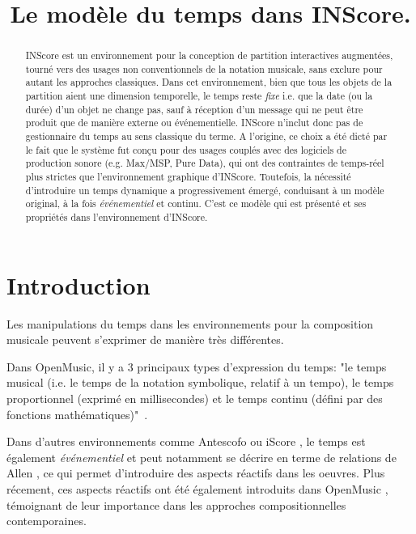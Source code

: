 \documentclass{article}
\title{Le modèle du temps dans INScore.}
\begin{document}
%
\maketitle
%
\begin{abstract}
INScore est un environnement pour la conception de partition interactives augmentées, tourné vers des usages non conventionnels de la notation musicale, sans exclure pour autant les approches classiques. Dans cet environnement, bien que tous les objets de la partition aient une dimension temporelle, le temps reste \emph{fixe} i.e. que la date (ou la durée) d'un objet ne change pas, sauf à réception d'un message qui ne peut être produit que de manière externe ou événementielle. INScore n'inclut donc pas de gestionnaire du temps au sens classique du terme. 
A l'origine, ce choix a été dicté par le fait que le système fut conçu pour des usages couplés avec des logiciels de production sonore (e.g. Max/MSP, Pure Data), qui ont des contraintes de temps-réel plus strictes que l'environnement graphique d'INScore.
Toutefois, la nécessité d'introduire un temps dynamique a progressivement émergé, conduisant à un modèle original, à la fois \emph{événementiel} et continu. C'est ce modèle qui est présenté et ses propriétés dans l'environnement d'INScore.
\end{abstract}

\section{Introduction}\label{sec:introduction}

Les manipulations du temps dans les environnements pour la composition musicale peuvent s'exprimer de manière très différentes.

Dans OpenMusic, il y a 3 principaux types d'expression du temps: "le temps musical (i.e. le temps de la notation symbolique, relatif à un tempo), le temps proportionnel (exprimé en millisecondes) et le temps continu (défini par des fonctions mathématiques)"~\cite{bresson08}. 

Dans d'autres environnements comme Antescofo \cite{acont08} ou iScore \cite{AllombertDA08}, le temps est également \textit{événementiel} et peut notamment se décrire en terme de relations de Allen \cite{Allen:1983:MKT:182.358434}, ce qui permet d'introduire des aspects réactifs dans les oeuvres. 
Plus récement, ces aspects réactifs ont été également introduits dans OpenMusic \cite{bresson:hal-00965747}, témoignant de leur importance dans les approches compositionnelles contemporaines.
\end{document}
